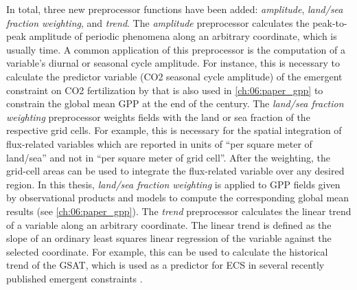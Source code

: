 In total, three new preprocessor functions have been added: \emph{amplitude},
\emph{land/sea fraction weighting}, and \emph{trend}. The \emph{amplitude}
preprocessor calculates the peak-to-peak amplitude of periodic phenomena along
an arbitrary coordinate, which is usually time. A common application of this
preprocessor is the computation of a variable's diurnal or seasonal cycle
amplitude. For instance, this is necessary to calculate the predictor variable
(\ac{CO2} seasonal cycle amplitude) of the emergent constraint on \ac{CO2}
fertilization by \textcite{Wenzel2016} that is also used in
\cref{ch:06:paper_gpp} to constrain the global mean \ac{GPP} at the end of the
 century. The \emph{land/sea fraction weighting} preprocessor weights
fields with the land or sea fraction of the respective grid cells. For example,
this is necessary for the spatial integration of flux-related variables which
are reported in units of \enquote{per square meter of land/sea} and not in
\enquote{per square meter of grid cell}. After the weighting, the grid-cell
areas can be used to integrate the flux-related variable over any desired
region. In this thesis, \emph{land/sea fraction weighting} is applied to
\ac{GPP} fields given by observational products and models to compute the
corresponding global mean results (see \cref{ch:06:paper_gpp}). The
\emph{trend} preprocessor calculates the linear trend of a variable along an
arbitrary coordinate. The linear trend is defined as the slope of an ordinary
least squares linear regression of the variable against the selected
coordinate. For example, this can be used to calculate the historical trend of
the \ac{GSAT}, which is used as a predictor for \ac{ECS} in several recently
published emergent constraints \autocite{JimenezdelaCuesta2019, Nijsse2020,
  Tokarska2020}.


